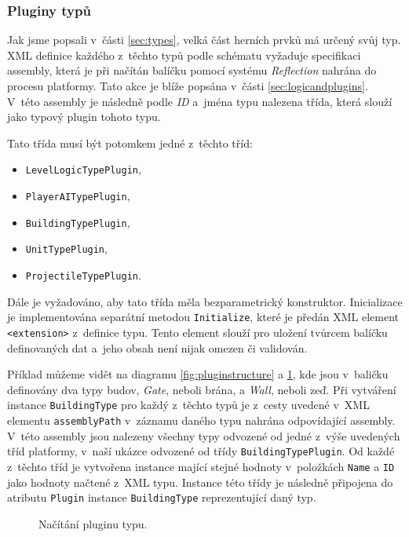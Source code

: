 \subsubsection{Pluginy typů}
\label{sec:typeplugins}
Jak jsme popsali v~části \ref{sec:types}, velká část herních prvků má určený svůj typ. XML definice každého z~těchto typů podle schématu vyžaduje specifikaci assembly, která je při načítán balíčku pomocí systému \textit{Reflection} nahrána do procesu platformy. Tato akce je blíže popsána v~části \ref{sec:logicandplugins}. V~této assembly je následně podle \textit{ID} a~jména typu nalezena třída, která slouží jako typový plugin tohoto typu. 

Tato třída musí být potomkem jedné z~těchto tříd:
\begin{itemize}
	\item \texttt{LevelLogicTypePlugin},
	\item \texttt{PlayerAITypePlugin},
	\item \texttt{BuildingTypePlugin},
	\item \texttt{UnitTypePlugin},
	\item \texttt{ProjectileTypePlugin}.
\end{itemize}

Dále je vyžadováno, aby tato třída měla bezparametrický konstruktor. Inicializace je implementována separátní metodou \texttt{Initialize}, které je předán XML element \texttt{<extension>} z~definice typu. Tento element slouží pro uložení tvůrcem balíčku definovaných dat a~jeho obsah není nijak omezen či validován.

Příklad můžeme vidět na diagramu \ref{fig:pluginstructure} a \ref{fig:typeplugincreation}, kde jsou v~baličku definovány dva typy budov, \textit{Gate}, neboli brána, a \textit{Wall}, neboli zeď. Při vytváření instance \texttt{BuildingType} pro každý z~těchto typů je z~cesty uvedené v~XML elementu \texttt{assemblyPath} v~záznamu daného typu nahrána odpovídající assembly. V~této assembly jsou nalezeny všechny typy odvozené od jedné z~výše uvedených tříd platformy, v~naší ukázce odvozené od třídy \texttt{BuildingTypePlugin}. Od každé z~těchto tříd je vytvořena instance mající stejné hodnoty v~položkách \texttt{Name} a \texttt{ID} jako hodnoty načtené z~XML typu. Instance této třídy je následně připojena do atributu \texttt{Plugin} instance \texttt{BuildingType} reprezentující daný typ.

\begin{figure}[h]
	\centering
	\fontsize{8pt}{11pt}\selectfont
	\def\svgwidth{\textwidth}
	
	\caption{Načítání pluginu typu.}
	\label{fig:typeplugincreation}
\end{figure}

